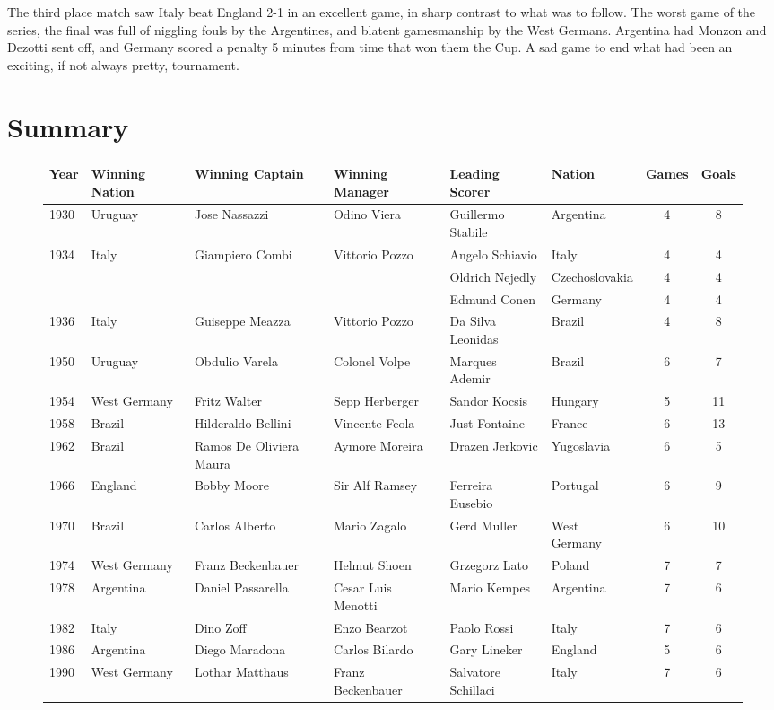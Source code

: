 The third place match saw Italy beat England 2-1 in an excellent game, in sharp
contrast to what was to follow. The worst game of the series, the final was 
full of niggling fouls by the Argentines, and blatent gamesmanship by the 
West Germans. Argentina had Monzon and Dezotti sent off, and Germany scored a 
penalty 5 minutes from time that won them the Cup. A sad game to end what had 
been an exciting, if not always pretty, tournament.
\section{Summary}
\begin{figure}[H]
\tiny
\begin{tabular}{l l l l l l c c}
Year & Winning Nation & Winning Captain & Winning Manager & Leading Scorer & Nation & Games & Goals\\ \hline
1930 & Uruguay & Jose Nassazzi & Odino Viera & Guillermo Stabile & Argentina & 4 & 8 \\
1934 & Italy & Giampiero Combi & Vittorio Pozzo & Angelo Schiavio & Italy & 4 & 4 \\
& & & & Oldrich Nejedly & Czechoslovakia & 4 & 4 \\
& & & & Edmund Conen & Germany & 4 & 4 \\
1936 & Italy & Guiseppe Meazza & Vittorio Pozzo & Da Silva Leonidas & Brazil & 4 & 8 \\
1950 & Uruguay & Obdulio Varela & Colonel Volpe & Marques Ademir & Brazil & 6 & 7 \\
1954 & West Germany & Fritz Walter & Sepp Herberger & Sandor Kocsis & Hungary & 5 & 11 \\
1958 & Brazil & Hilderaldo Bellini & Vincente Feola & Just Fontaine & France & 6 & 13 \\
1962 & Brazil & Ramos De Oliviera Maura & Aymore Moreira & Drazen Jerkovic & Yugoslavia & 6 & 5 \\
1966 & England & Bobby Moore & Sir Alf Ramsey & Ferreira Eusebio & Portugal & 6 & 9 \\
1970 & Brazil & Carlos Alberto & Mario Zagalo & Gerd Muller & West Germany & 6 & 10 \\
1974 & West Germany & Franz Beckenbauer & Helmut Shoen & Grzegorz Lato & Poland & 7 & 7 \\
1978 & Argentina & Daniel Passarella & Cesar Luis Menotti & Mario Kempes & Argentina & 7 & 6 \\
1982 & Italy & Dino Zoff & Enzo Bearzot & Paolo Rossi & Italy & 7 & 6 \\
1986 & Argentina & Diego Maradona & Carlos Bilardo & Gary Lineker & England & 5 & 6 \\
1990 & West Germany & Lothar Matthaus & Franz Beckenbauer & Salvatore Schillaci & Italy & 7 & 6 \\ \hline
\end{tabular}
\normalsize
\end{figure}

